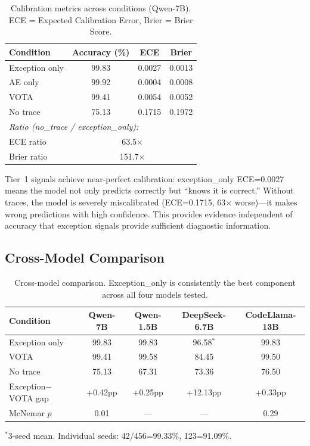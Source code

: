 \documentclass[11pt]{article}
\begin{document}
\begin{table}[h]
\centering
\caption{Calibration metrics across conditions (Qwen-7B). ECE = Expected Calibration Error, Brier = Brier Score.}
\label{tab:calibration}
\small
\begin{tabular}{lccc}
\toprule
\textbf{Condition} & \textbf{Accuracy (\%)} & \textbf{ECE} & \textbf{Brier} \\
\midrule
Exception only & 99.83 & 0.0027 & 0.0013 \\
AE only & 99.92 & 0.0004 & 0.0008 \\
VOTA & 99.41 & 0.0054 & 0.0052 \\
No trace & 75.13 & 0.1715 & 0.1972 \\
\midrule
\multicolumn{4}{l}{\textit{Ratio (no\_trace / exception\_only):}} \\
\quad ECE ratio & \multicolumn{3}{c}{63.5$\times$} \\
\quad Brier ratio & \multicolumn{3}{c}{151.7$\times$} \\
\bottomrule
\end{tabular}
\end{table}

Tier~1 signals achieve near-perfect calibration: exception\_only ECE=0.0027 means the model not only predicts correctly but ``knows it is correct.'' Without traces, the model is severely miscalibrated (ECE=0.1715, 63$\times$ worse)---it makes wrong predictions with high confidence. This provides evidence independent of accuracy that exception signals provide sufficient diagnostic information.

\subsection{Cross-Model Comparison}

\begin{table}[h]
\centering
\caption{Cross-model comparison. Exception\_only is consistently the best component across all four models tested.}
\label{tab:crossmodel}
\small
\begin{tabular}{lcccc}
\toprule
\textbf{Condition} & \textbf{Qwen-7B} & \textbf{Qwen-1.5B} & \textbf{DeepSeek-6.7B} & \textbf{CodeLlama-13B} \\
\midrule
Exception only & 99.83 & 99.83 & 96.58$^*$ & 99.83 \\
VOTA & 99.41 & 99.58 & 84.45 & 99.50 \\
No trace & 75.13 & 67.31 & 73.36 & 76.50 \\
\midrule
Exception$-$VOTA gap & +0.42pp & +0.25pp & +12.13pp & +0.33pp \\
McNemar $p$ & 0.01 & --- & --- & 0.29 \\
\bottomrule
\end{tabular}
\vspace{2pt}

{\footnotesize $^*$3-seed mean. Individual seeds: 42/456=99.33\%, 123=91.09\%.}
\end{table}
\end{document}
